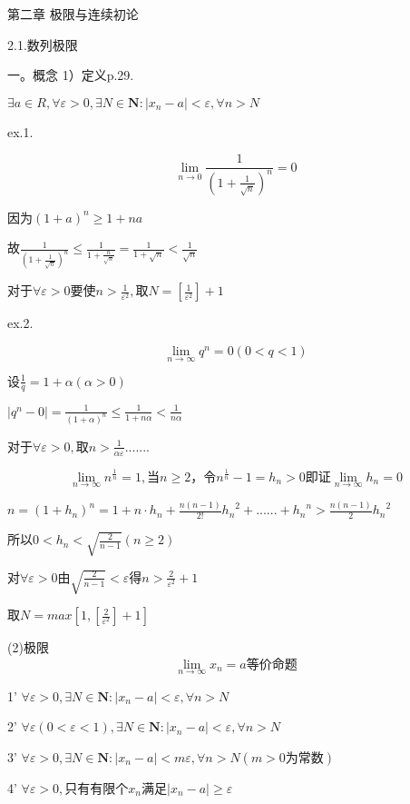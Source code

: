 \documentclass[12pt,a4paper]{article}
\begin{document}
\newcommand{\ntinf}{\lim\limits_{n \to \infty}}
\newcommand{\ntx}[1]{\lim\limits_{n \to #1}}
\newcommand{\xtx}[1]{\lim\limits_{x \to #1}}

第二章 极限与连续初论

2.1.数列极限

一。概念
1）定义p.29.

$\exists a \in R , \forall \varepsilon > 0, \exists N \in \bm{N}:|x_n-a|<\varepsilon, \forall n>N $

ex.1.

$$\lim_{n \to 0} \frac{1}{(1+\frac{1}{\sqrt{n}})^n}=0$$

因为$(1+a)^n \ge 1+na$

故$\frac{1}{(1+\frac{1}{\sqrt{n}})^n} \le \frac{1}{1+\frac{n}{\sqrt n}} = \frac {1}{1+\sqrt n}< \frac{1}{\sqrt n}$

对于$\forall \varepsilon >0 要使n> \frac{1}{\varepsilon ^ 2},取N=[\frac {1}{\varepsilon ^ 2}]+1$

ex.2.

$$\lim_{n \to \infty} q^n = 0 (0<q<1)$$

$设\frac{1}{q}= 1+\alpha (\alpha > 0)$

$|q^n-0|= \frac{1}{(1+\alpha)^n} \le \frac{1}{1+n\alpha} < \frac{1}{n\alpha}$

对于$\forall \varepsilon > 0, 取n>\frac{1}{\alpha \varepsilon} .......$

$$\lim_{n \to \infty}n^{\frac{1}{n}}=1,当n\ge 2，令n^{\frac{1}{n}}-1=h_n>0即证\lim_{n \to \infty}h_n=0$$

$n=(1+h_n)^n=1+n\cdot h_n+\frac{n(n-1)}{2!}{h_n}^2+......+{h_n}^n>\frac{n(n-1)}{2}{h_n}^2$

$所以0<h_n<\sqrt{\frac{2}{n-1}} (n \ge 2)$

$对\forall \varepsilon > 0 由\sqrt{\frac{2}{n-1}} < \varepsilon 得 n>\frac{2}{\varepsilon ^2}+1$

$取N=max[1,[\frac{2}{\varepsilon ^ 2}]+1]$

(2)极限$$\lim_{n \to \infty}x_n=a等价命题$$

1’ $\forall \varepsilon>0 ,\exists N \in \bm{N}:|x_n-a|<\varepsilon,\forall n>N$

2’ $\forall \varepsilon(0<\varepsilon<1) ,\exists N \in \bm{N}:|x_n-a|<\varepsilon,\forall n>N$

3’ $\forall \varepsilon>0 ,\exists N \in \bm{N}:|x_n-a|<m\varepsilon,\forall n>N(m>0为常数)$

4’ $\forall \varepsilon>0 ,只有有限个x_n满足|x_n-a|\ge\varepsilon$
\end{document}
